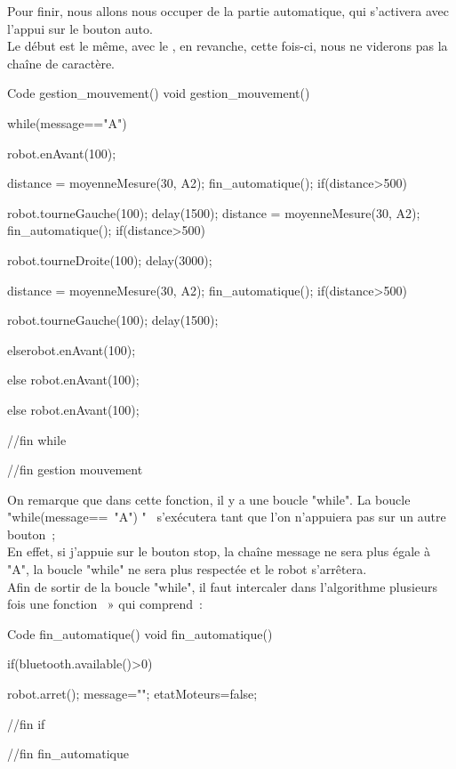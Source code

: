 Pour finir, nous allons nous occuper de la partie automatique, qui s'activera avec l'appui sur le bouton auto. \\
Le début est le même, avec le , en revanche, cette fois-ci, nous ne viderons pas la chaîne de caractère.

\begin{Cpp}{Code gestion\_mouvement()}
 void gestion_mouvement() {

  while(message=="A") {

  robot.enAvant(100);
    
    distance = moyenneMesure(30, A2);
    fin_automatique(); 
    if(distance>500) {

      robot.tourneGauche(100);
      delay(1500);
      distance = moyenneMesure(30, A2);
      fin_automatique(); 
      if(distance>500) {

        robot.tourneDroite(100);
        delay(3000);

        distance = moyenneMesure(30, A2);
        fin_automatique(); 
        if(distance>500) {

            robot.tourneGauche(100);
            delay(1500);
        }
        else{robot.enAvant(100);}

      }                
      else  {robot.enAvant(100);}   

    }
     else {robot.enAvant(100);}  

 }//fin while
 }//fin gestion mouvement
\end{Cpp}


On remarque que dans cette fonction, il y a une boucle "while".
La boucle "while(message== "A") {}"  s’exécutera tant que l'on n’appuiera pas sur un autre bouton ;\\ 
En effet, si j'appuie sur le bouton stop, la chaîne message ne sera plus égale à "A", la boucle "while" ne sera plus respectée et le robot s’arrêtera. \\

Afin de sortir de la boucle "while", il faut intercaler dans l'algorithme plusieurs fois une fonction  » qui comprend :

\begin{Cpp}{Code fin\_automatique()}
 void fin_automatique() {

if(bluetooth.available()>0) {
  robot.arret();
  message="";
  etatMoteurs=false;

}//fin if

}//fin fin_automatique

\end{Cpp}

